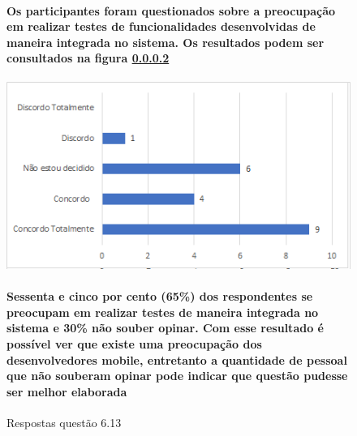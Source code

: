 \begin{figure}[!t]
\centering
\paragraph{Os participantes foram questionados sobre a preocupação em realizar testes de funcionalidades desenvolvidas de maneira integrada no sistema. Os resultados podem ser consultados na figura \ref{fig:6.13}}
\includegraphics[scale=0.7]{figuras das questoes/6.13.png}
\caption{Respostas questão 6.13}
\paragraph{ Sessenta e cinco por cento (65{\%}) dos respondentes se preocupam em realizar testes de maneira integrada no sistema e 30{\%} não souber opinar. Com esse resultado é possível ver que existe uma preocupação dos desenvolvedores mobile, entretanto a quantidade de pessoal que não souberam opinar pode indicar que questão pudesse ser melhor elaborada}
\label{fig:6.13}
\end{figure}
